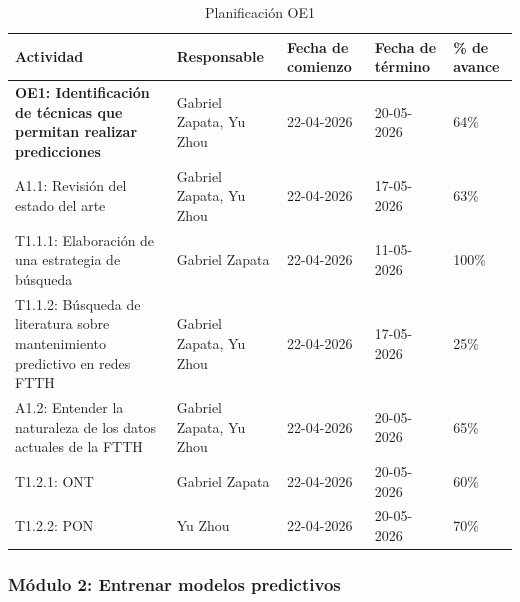 \documentclass[12pt,a4paper]{article}
\begin{document}
        \begin{table}[H]
            \centering
            \renewcommand{\arraystretch}{1.5}
            \begin{tabular}{|p{5cm}|p{3cm}|p{2cm}|p{2cm}|p{2cm}|}
            \hline
            \textbf{Actividad} & \textbf{Responsable} & \textbf{Fecha de comienzo} & \textbf{Fecha de término} & \textbf{\% de avance} \\ \hline
            \textbf{OE1: Identificación de técnicas que permitan realizar predicciones} & Gabriel Zapata, Yu Zhou & 22-04-2026 & 20-05-2026 & 64\% \\ \hline
            A1.1: Revisión del estado del arte & Gabriel Zapata, Yu Zhou & 22-04-2026 & 17-05-2026 & 63\% \\ \hline
            T1.1.1: Elaboración de una estrategia de búsqueda & Gabriel Zapata & 22-04-2026 & 11-05-2026 & 100\% \\ \hline
            T1.1.2: Búsqueda de literatura sobre mantenimiento predictivo en redes FTTH & Gabriel Zapata, Yu Zhou & 22-04-2026 & 17-05-2026 & 25\% \\ \hline
            A1.2: Entender la naturaleza de los datos actuales de la FTTH & Gabriel Zapata, Yu Zhou & 22-04-2026 & 20-05-2026 & 65\% \\ \hline
            T1.2.1: ONT & Gabriel Zapata & 22-04-2026 & 20-05-2026 & 60\% \\ \hline
            T1.2.2: PON & Yu Zhou & 22-04-2026 & 20-05-2026 & 70\% \\ \hline
            \end{tabular}
            \caption{Planificación OE1}
            \label{tab:planificacion_avance}
        \end{table}

    \subsubsection{Módulo 2: Entrenar modelos predictivos}
\end{document}
